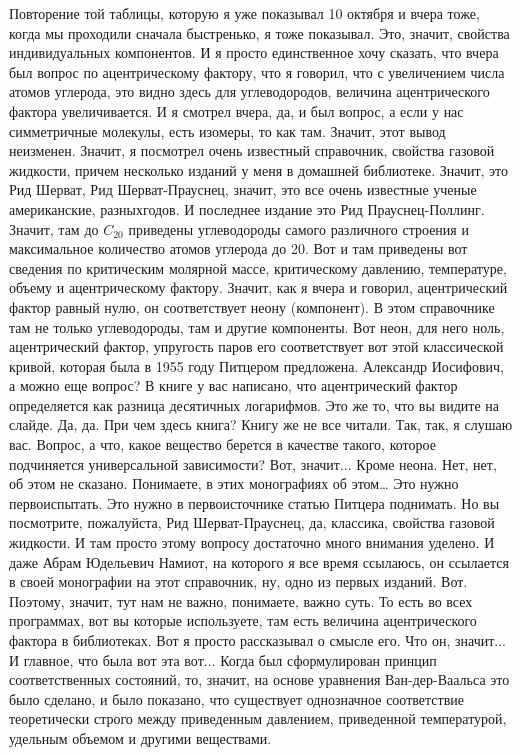 \documentclass[main.tex]{subfiles}
\begin{document}
Повторение той таблицы, которую я уже показывал 10 октября и вчера тоже, когда мы проходили сначала быстренько, я тоже показывал.
Это, значит, свойства индивидуальных компонентов.
И я просто единственное хочу сказать, что вчера был вопрос по ацентрическому фактору, что я говорил, что с увеличением числа атомов углерода, это видно здесь для углеводородов, величина ацентрического
фактора увеличивается.
И я смотрел вчера, да, и был вопрос, а если у нас симметричные молекулы, есть изомеры, то как там.
Значит, этот вывод неизменен.
Значит, я посмотрел очень известный справочник, свойства газовой жидкости, причем несколько изданий у меня в домашней библиотеке.
Значит, это Рид Шерват, Рид Шерват-Прауснец, значит, это все очень известные ученые американские, разныхгодов.
И последнее издание это Рид Прауснец-Поллинг.
Значит, там до $C_{20}$ приведены углеводороды самого различного строения и максимальное количество атомов углерода до 20.
Вот и там приведены вот сведения по критическим молярной массе, критическому давлению, температуре, объему и ацентрическому фактору.
Значит, как я вчера и говорил, ацентрический фактор равный нулю, он соответствует неону (компонент).
В этом справочнике там не только углеводороды, там и другие компоненты.
Вот неон, для него ноль, ацентрический фактор, упругость паров его соответствует вот этой классической кривой, которая была в 1955 году Питцером предложена.
Александр Иосифович, а можно еще вопрос?
В книге у вас написано, что ацентрический фактор определяется как разница десятичных логарифмов.
Это же то, что вы видите на слайде.
Да, да.
При чем здесь книга?
Книгу же не все читали.
Так, так, я слушаю вас.
Вопрос, а что, какое вещество берется в качестве такого, которое подчиняется универсальной зависимости?
Вот, значит...
Кроме неона.
Нет, нет, об этом не сказано.
Понимаете, в этих монографиях об этом… Это нужно первоиспытать.
Это нужно в первоисточнике статью Питцера поднимать.
Но вы посмотрите, пожалуйста, Рид Шерват-Прауснец, да, классика, свойства газовой жидкости.
И там просто этому вопросу достаточно много внимания уделено.
И даже Абрам Юдельевич Намиот, на которого я все время ссылаюсь, он ссылается в своей монографии на этот справочник, ну, одно из первых изданий.
Вот.
Поэтому, значит, тут нам не важно, понимаете, важно суть.
То есть во всех программах, вот вы которые используете, там есть величина ацентрического фактора в библиотеках.
Вот я просто рассказывал о смысле его.
Что он, значит...
И главное, что была вот эта вот...
Когда был сформулирован принцип соответственных состояний, то, значит, на основе уравнения Ван-дер-Ваальса это было сделано, и было показано, что существует однозначное соответствие теоретически строго между приведенным давлением, приведенной температурой, удельным объемом и другими веществами.
\end{document}
